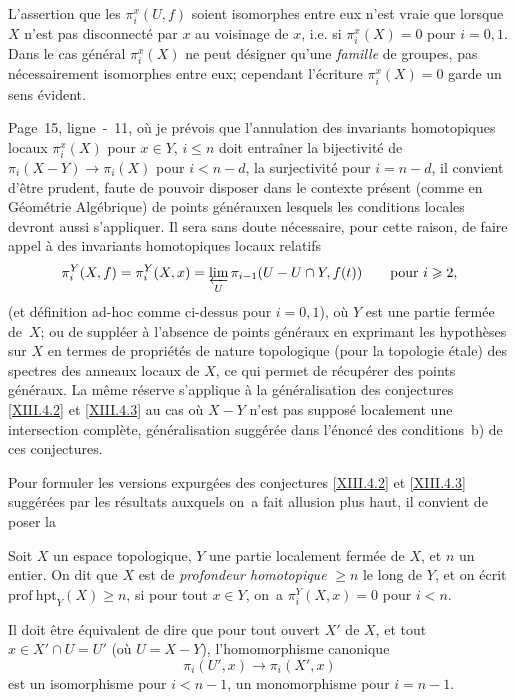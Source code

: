 L'assertion que les $\pi_i^x(U, f)$ soient isomorphes entre eux n'est vraie que lorsque $X$ n'est pas disconnect\'e par $x$ au voisinage de $x$, i.e. si $\pi_i^x(X)=0$ pour $i=0, 1$. Dans le cas g\'en\'eral $\pi_i^x(X)$ ne peut d\'esigner qu'une \emph{famille} de groupes, pas n\'ecessairement isomorphes entre eux; cependant l'\'ecriture $\pi_i^x(X)=0$ garde un sens \'evident.

\label{p26y}Page~15, ligne~-~11, o\`u je pr\'evois que l'annulation des invariants homotopiques locaux $\pi_i^x(X)$ pour $x\in Y$, $i\leq n$ doit entra\^iner la bijectivit\'e de $\pi_i(X-Y)\to\pi_i(X)$ pour $i<n-d$, la surjectivit\'e pour $i=n-d$, il convient d'\^etre prudent, faute de pouvoir disposer dans le contexte pr\'esent (comme en G\'eom\'etrie Alg\'ebrique) de points \og g\'en\'eraux\fg en lesquels les conditions locales devront aussi s'appliquer. Il sera sans doute n\'ecessaire, pour cette raison, de faire appel \`a des invariants homotopiques locaux relatifs
$$
\pi_i^Y(X, f)=\pi_i^Y(X, x)=\varprojlim_U \pi_{i-1}(U-U\cap Y, f(t))\qquad\text{pour }i\geqslant 2,
$$
(et d\'efinition {ad-hoc} comme ci-dessus pour $i=0, 1$), o\`u $Y$ est une partie ferm\'ee de~$X$; ou de suppl\'eer \`a l'absence de points g\'en\'eraux en exprimant les hypoth\`eses sur $X$ en termes de propri\'et\'es de nature topologique (pour la topologie \'etale) des spectres des anneaux locaux de $X$, ce qui permet de r\'ecup\'erer des points g\'en\'eraux. La m\^eme r\'eserve s'applique \`a la g\'en\'eralisation des conjectures \ref{XIII.4.2} et \ref{XIII.4.3} au cas o\`u $X-Y$ n'est pas suppos\'e localement une intersection compl\`ete, g\'en\'eralisation sugg\'er\'ee dans l'\'enonc\'e des conditions~b) de ces conjectures.

Pour formuler les versions expurg\'ees des conjectures \ref{XIII.4.2} et \ref{XIII.4.3} sugg\'er\'ees par les r\'esultats auxquels on~a fait allusion plus haut, il convient de poser la

\begin{supdefinition} \label{XIII.6.1} Soit $X$ un espace topologique, $Y$ une partie localement ferm\'ee de $X$, et $n$ un entier. On dit que $X$ est de \emph{profondeur homotopique} $\geq n$ le long de $Y$, et on \'ecrit $\mathrm{prof\:hpt}_Y(X)\geq n$, si pour tout $x\in Y$, on~a $\pi_i^Y(X, x)=0$ pour $i<n$.
\end{supdefinition}

Il doit \^etre \'equivalent de dire que pour tout ouvert $X'$ de $X$, et tout $x\in X'\cap U=U'$ (o\`u $U=X-Y$), l'homomorphisme canonique
$$
\pi_i(U', x)\to\pi_i(X', x)$$
est un isomorphisme pour $i<n-1$, un monomorphisme pour $i=n-1$.

